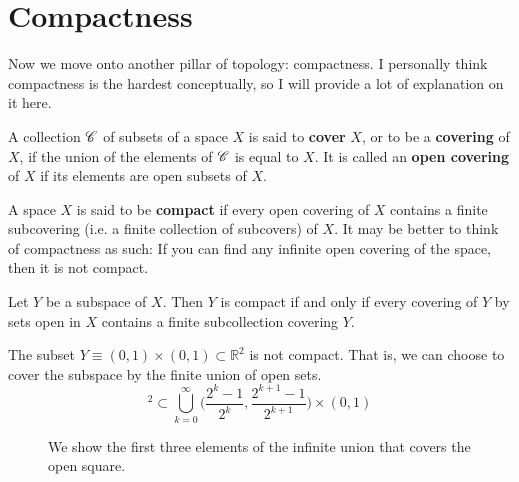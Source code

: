 \section{Compactness} 

  Now we move onto another pillar of topology: compactness. I personally think compactness is the hardest conceptually, so I will provide a lot of explanation on it here. 

  \begin{definition}[Covers]
    A collection $\operatorname{\mathscr{C}}$ of subsets of a space $X$ is said to \textbf{cover} $X$, or to be a \textbf{covering} of $X$, if the union of the elements of $\operatorname{\mathscr{C}}$ is equal to $X$. It is called an \textbf{open covering} of $X$ if its elements are open subsets of $X$. 
  \end{definition}

  \begin{definition}[Compactness]
    A space $X$ is said to be \textbf{compact} if every open covering of $X$ contains a finite subcovering (i.e. a finite collection of subcovers) of $X$. It may be better to think of compactness as such: If you can find any infinite open covering of the space, then it is not compact. 
  \end{definition}

  \begin{lemma}
    Let $Y$ be a subspace of $X$. Then $Y$ is compact if and only if every covering of $Y$ by sets open in $X$ contains a finite subcollection covering $Y$. 
  \end{lemma}


  \begin{example}
    The subset $Y \equiv (0,1) \times (0,1) \subset \mathbb{R}^2$ is not compact. That is, we can choose to cover the subspace by the finite union of open sets. 
    \begin{equation}
      [0,1]^2 \subset \bigcup_{k=0}^\infty \Big( \frac{2^k - 1}{2^k}, \frac{2^{k+1} - 1}{2^{k+1}} \Big) \times (0,1)
    \end{equation}

    \begin{figure}[H]
      \centering 
      \caption{We show the first three elements of the infinite union that covers the open square. }
      \label{fig:closed_square_compact}
    \end{figure}
    \begin{center}
    \end{center}
  \end{example}

